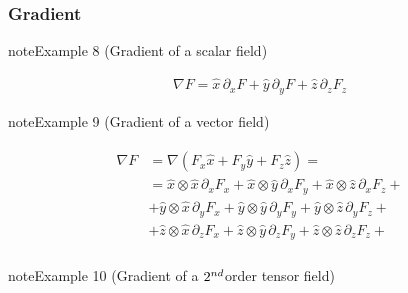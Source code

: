 \documentclass[letterpaper,10pt,english]{jupyterBook}
\begin{document}
\subsubsection{Gradient}
\label{\detokenize{ch/tensor-algebra-calculus/calculus-euclidean-cartesian:gradient}}\label{\detokenize{ch/tensor-algebra-calculus/calculus-euclidean-cartesian:tensor-calculus-cartesian-differential-operators-gradient}}\label{ch/tensor-algebra-calculus/calculus-euclidean-cartesian:example-0}
\begin{sphinxadmonition}{note}{Example 8 (Gradient of a scalar field)}


\begin{equation*}
\begin{split}\nabla F = \hat{x} \, \partial_x F + \hat{y} \, \partial_y F + \hat{z} \, \partial_z F_z\end{split}
\end{equation*}\end{sphinxadmonition}
\label{ch/tensor-algebra-calculus/calculus-euclidean-cartesian:example-1}
\begin{sphinxadmonition}{note}{Example 9 (Gradient of a vector field)}


\begin{equation*}
\begin{split}\begin{aligned}
\nabla F 
  & = \nabla (F_x \hat{x} + F_y \hat{y} + F_z \hat{z}) = \\
  & = \hat{x} \otimes \hat{x} \, \partial_x F_x + \hat{x} \otimes \hat{y} \, \partial_x F_y + \hat{x} \otimes \hat{z} \, \partial_x F_z + \\
  & + \hat{y} \otimes \hat{x} \, \partial_y F_x + \hat{y} \otimes \hat{y} \, \partial_y F_y + \hat{y} \otimes \hat{z} \, \partial_y F_z + \\
  & + \hat{z} \otimes \hat{x} \, \partial_z F_x + \hat{z} \otimes \hat{y} \, \partial_z F_y + \hat{z} \otimes \hat{z} \, \partial_z F_z + \\
\end{aligned}\end{split}
\end{equation*}\end{sphinxadmonition}
\label{ch/tensor-algebra-calculus/calculus-euclidean-cartesian:example-2}
\begin{sphinxadmonition}{note}{Example 10 (Gradient of a \protect\(2^{nd}\protect\)\sphinxhyphen{}order tensor field)}


\end{sphinxadmonition}
\end{document}
